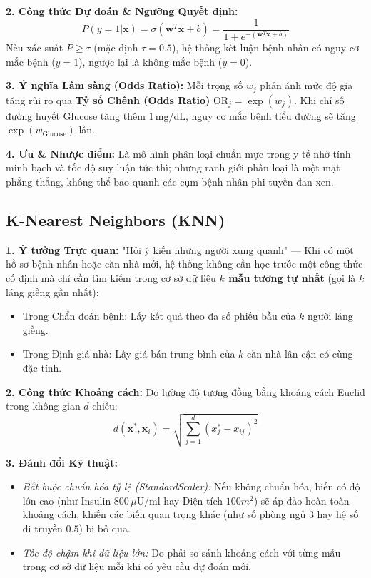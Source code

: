\documentclass[12pt,a4paper]{report}
\begin{document}
\textbf{2. Công thức Dự đoán \& Ngưỡng Quyết định:}
\begin{equation}
P(y=1|\mathbf{x}) = \sigma(\mathbf{w}^T \mathbf{x} + b) = \frac{1}{1 + e^{-(\mathbf{w}^T \mathbf{x} + b)}}
\end{equation}
Nếu xác suất $P \ge \tau$ (mặc định $\tau = 0.5$), hệ thống kết luận bệnh nhân có nguy cơ mắc bệnh ($y=1$), ngược lại là không mắc bệnh ($y=0$).

\textbf{3. Ý nghĩa Lâm sàng (Odds Ratio):} Mỗi trọng số $w_j$ phản ánh mức độ gia tăng rủi ro qua \textbf{Tỷ số Chênh (Odds Ratio)} $\text{OR}_j = \exp(w_j)$. Khi chỉ số đường huyết Glucose tăng thêm $1\,\text{mg/dL}$, nguy cơ mắc bệnh tiểu đường sẽ tăng $\exp(w_{\text{Glucose}})$ lần.

\textbf{4. Ưu \& Nhược điểm:} Là mô hình phân loại chuẩn mực trong y tế nhờ tính minh bạch và tốc độ suy luận tức thì; nhưng ranh giới phân loại là một mặt phẳng thẳng, không thể bao quanh các cụm bệnh nhân phi tuyến đan xen.

\subsection{K-Nearest Neighbors (KNN)}
\textbf{1. Ý tưởng Trực quan:} "Hỏi ý kiến những người xung quanh" — Khi có một hồ sơ bệnh nhân hoặc căn nhà mới, hệ thống không cần học trước một công thức cố định mà chỉ cần tìm kiếm trong cơ sở dữ liệu \textbf{$k$ mẫu tương tự nhất} (gọi là $k$ láng giềng gần nhất):
\begin{itemize}[leftmargin=1.5em]
    \item Trong Chẩn đoán bệnh: Lấy kết quả theo đa số phiếu bầu của $k$ người láng giềng.
    \item Trong Định giá nhà: Lấy giá bán trung bình của $k$ căn nhà lân cận có cùng đặc tính.
\end{itemize}

\textbf{2. Công thức Khoảng cách:} Đo lường độ tương đồng bằng khoảng cách Euclid trong không gian $d$ chiều:
\begin{equation}
d(\mathbf{x}^*, \mathbf{x}_i) = \sqrt{\sum_{j=1}^d (x^*_j - x_{ij})^2}
\end{equation}

\textbf{3. Đánh đổi Kỹ thuật:} 
\begin{itemize}[leftmargin=1.2em]
    \item \textit{Bắt buộc chuẩn hóa tỷ lệ (StandardScaler):} Nếu không chuẩn hóa, biến có độ lớn cao (như Insulin $800\,\mu\text{U/ml}$ hay Diện tích $100m^2$) sẽ áp đảo hoàn toàn khoảng cách, khiến các biến quan trọng khác (như số phòng ngủ $3$ hay hệ số di truyền $0.5$) bị bỏ qua.
    \item \textit{Tốc độ chậm khi dữ liệu lớn:} Do phải so sánh khoảng cách với từng mẫu trong cơ sở dữ liệu mỗi khi có yêu cầu dự đoán mới.
\end{itemize}
\end{document}
